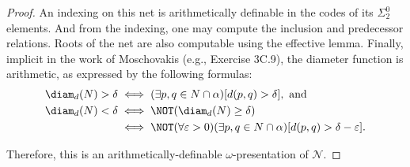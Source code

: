 \begin{proof}
    An indexing on this net is arithmetically definable in the codes of its $\Sigma^0_2$ elements. And from the indexing, one may compute the inclusion and predecessor relations. Roots of the net are also computable using the effective lemma. Finally, implicit in the work of Moschovakis \cite{Mos09} (e.g., Exercise 3C.9), the diameter function is arithmetic, as expressed by the following formulas:
    \begin{align*}
        \diam_d(N) > \delta &\iff (\exists p,q \in N \cap \alpha) [d(p, q) > \delta], \text{ and}\\
        \diam_d(N) < \delta &\iff \NOT (\diam_d(N) \geq \delta)\\
        &\iff \NOT (\forall \varepsilon > 0) (\exists p, q \in N \cap \alpha) [d(p, q) > \delta - \varepsilon].
    \end{align*}
    
    Therefore, this is an arithmetically-definable $\omega$-presentation of $\mathcal{N}$. 
\end{proof}

